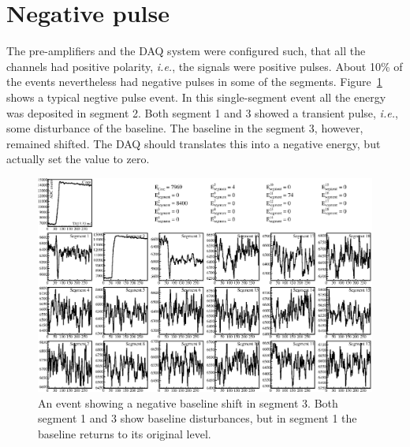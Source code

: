 

\section{Negative pulse}
\label{sec:ii:npulse}
The pre-amplifiers and the DAQ system were configured such, that all the channels had positive polarity, \textit{i.e.}, the signals were positive pulses. About 10\% of the events nevertheless had negative pulses in some of the segments. Figure~\ref{fig:ii:npul} shows a typical negtive pulse event. In this single-segment event all the energy was deposited in segment 2. Both segment 1 and 3 showed a transient pulse, \textit{i.e.}, some disturbance of the baseline. The baseline in the segment 3, however, remained shifted. The DAQ should translates this into a negative energy, but actually set the value to zero.

\begin{figure}
\centering
\includegraphics{npul}
\caption{An event showing a negative baseline shift in segment 3. Both segment 1 and 3 show baseline disturbances, but in segment 1 the baseline returns to its original level.}
\label{fig:ii:npul}
\end{figure}

